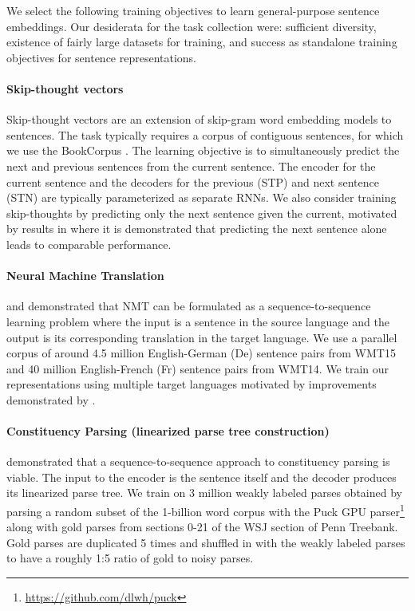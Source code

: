 \documentclass{article} \usepackage{iclr2018_conference,times}
\begin{document}
We select the following training objectives to learn general-purpose sentence embeddings. Our desiderata for the task collection were: sufficient diversity, existence of fairly large datasets for training, and success as standalone training objectives for sentence representations.

\paragraph{Skip-thought vectors} Skip-thought vectors \citep{kiros2015skip} are an extension of skip-gram word embedding models to sentences. The task typically requires a corpus of contiguous sentences, for which we use the BookCorpus \citep{zhu2015aligning}. The learning objective is to simultaneously predict the next and previous sentences from the current sentence. The encoder for the current sentence and the decoders for the previous (STP) and next sentence (STN) are typically parameterized as separate RNNs. We also consider training skip-thoughts by predicting only the next sentence given the current, motivated by results in \cite{tang2017rethinking} where it is demonstrated that predicting the next sentence alone leads to comparable performance.

\paragraph{Neural Machine Translation} \cite{sutskever2014sequence} and \cite{cho2014learning} demonstrated that NMT can be formulated as a sequence-to-sequence learning problem where the input is a sentence in the source language and the output is its corresponding translation in the target language. We use a parallel corpus of around 4.5 million English-German (De) sentence pairs from WMT15 and 40 million English-French (Fr) sentence pairs from WMT14. We train our representations using multiple target languages motivated by improvements demonstrated by \cite{dong2015multi}.

\paragraph{Constituency Parsing (linearized parse tree construction)} \cite{vinyals2015grammar} demonstrated that a sequence-to-sequence approach to constituency parsing is viable. The input to the encoder is the sentence itself and the decoder produces its linearized parse tree. We train on 3 million weakly labeled parses obtained by parsing a random subset of the 1-billion word corpus with the Puck GPU parser\footnote{\url{https://github.com/dlwh/puck}} along with gold parses from sections 0-21 of the WSJ section of Penn Treebank. Gold parses are duplicated 5 times and shuffled in with the weakly labeled parses to have a roughly 1:5 ratio of gold to noisy parses.
\end{document}
